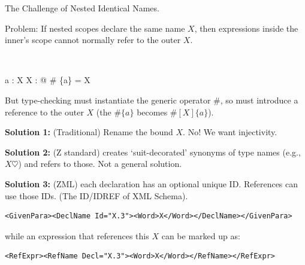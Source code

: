 \documentclass[%
   slidesonly,%
   semhelv,%
   landscape]{seminar}
\begin{document}
\begin{slide}
\begin{center}
The Challenge of Nested Identical Names.
\end{center}

Problem: If nested scopes declare the same name $X$, then
expressions inside the inner's scope cannot normally refer to the outer
$X$.
\begin{zed}
    [X] \\
\end{zed}
\begin{axdef}
    a : X
\where
    \exists X : \nat @ \# \{a\} = X
\end{axdef}

But type-checking must instantiate the generic operator $\#$,
so must introduce a reference to the outer $X$ (the $\# \{a\}$ becomes
$\#[X]\{a\}$). 

\textbf{Solution 1:} (Traditional) Rename the bound $X$.  No!  We want
injectivity. 

\textbf{Solution 2:} (Z standard) creates `suit-decorated' synonyms of 
  type names (e.g., $X\heartsuit$) and refers to those.  Not a general
  solution. 

\textbf{Solution 3:} (ZML) each declaration has an optional unique ID. 
  References can use those IDs.  (The ID/IDREF of XML Schema).
\end{slide}

\begin{small}
\begin{verbatim}
<GivenPara><DeclName Id="X.3"><Word>X</Word></DeclName></GivenPara>
\end{verbatim}
\end{small}
while an expression that references this $X$ can be marked up as:
\begin{small}
\begin{verbatim}
<RefExpr><RefName Decl="X.3"><Word>X</Word></RefName></RefExpr>
\end{verbatim}
\end{small}
\end{document}
